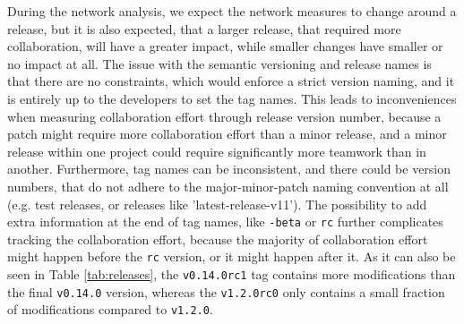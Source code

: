 During the network analysis, we expect the network measures to change around a release, but it is also expected, that a larger release, that required more collaboration, will have a greater impact, while smaller changes have smaller or no impact at all. The issue with the semantic versioning and release names is that there are no constraints, which would enforce a strict version naming, and it is entirely up to the developers to set the tag names. This leads to inconveniences when measuring collaboration effort through release version number, because a patch might require more collaboration effort than a minor release, and a minor release within one project could require significantly more teamwork than in another. Furthermore, tag names can be inconsistent, and there could be version numbers, that do not adhere to the major-minor-patch naming convention at all (e.g. test releases, or releases like 'latest-release-v11'). The possibility to add extra information at the end of tag names, like \texttt{-beta} or \texttt{rc} further complicates tracking the collaboration effort, because the majority of collaboration effort might happen before the \texttt{rc} version, or it might happen after it. As it can also be seen in Table \ref{tab:releases}, the \texttt{v0.14.0rc1} tag contains more modifications than the final \texttt{v0.14.0} version, whereas the \texttt{v1.2.0rc0} only contains a small fraction of modifications compared to \texttt{v1.2.0}. \\

